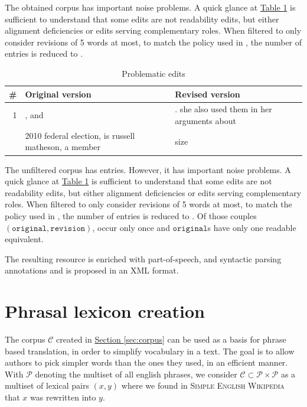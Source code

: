 \documentclass[a4paper, 11pt, onepage]{scrreprt}
\newcommand\sew{\textsc{Simple English Wikipedia}}
\newcommand\tableref[1]{\hyperref[#1]{Table \ref*{#1}}}
\newcommand\sectionref[1]{\hyperref[#1]{Section \ref*{#1}}}
\begin{document}
The obtained corpus has important noise problems. A quick glance at
\tableref{tab:problematic-edits} is sufficient to understand that some
edits are not readability edits, but either alignment deficiencies or
edits serving complementary roles. When filtered to only consider
revisions of 5 words at most, to match the policy used in
\cite{yatskar2010sake}, the number of entries is reduced to
.

\begin{table}[H]
  \centering
  \caption{Problematic edits}
  \begin{tabular}{rp{6cm}p{6cm}}
    \toprule
    \# & Original version & Revised version \\
    \midrule
    1 & , and & . she also used them in her arguments about \\
    \addlinespace
    2 & 2010 federal election, is russell matheson, a member & size\\
  \end{tabular}
  \label{tab:problematic-edits}
\end{table}

The unfiltered corpus has  entries. However, it has
important noise problems. A quick glance at
\tableref{tab:problematic-edits} is sufficient to understand that some
edits are not readability edits, but either alignment deficiencies or
edits serving complementary roles. When filtered to only consider
revisions of 5 words at most, to match the policy used in
\cite{yatskar2010sake}, the number of entries is reduced to
. Of those  couples $(\mathtt{original},
\mathtt{revision})$,  occur only once and
 $\mathtt{original}$s have only one readable
equivalent.

The resulting resource is enriched with part-of-speech, and syntactic
parsing annotations and is proposed in an XML format.

\section{Phrasal lexicon creation}
\label{sec:lexical-enhancements}

The corpus $\mathcal{C}$ created in \sectionref{sec:corpus} can be
used as a basis for phrase based translation, in order to simplify
vocabulary in a text. The goal is to allow authors to pick simpler
words than the ones they used, in an efficient manner. With
$\mathcal{P}$ denoting the multiset of all english phrases, we
consider $\mathcal{C} \subset \mathcal{P} \times \mathcal{P}$ as a
multiset of lexical pairs $(x, y)$ where we found in \sew{} that $x$
was rewritten into $y$.
\end{document}
